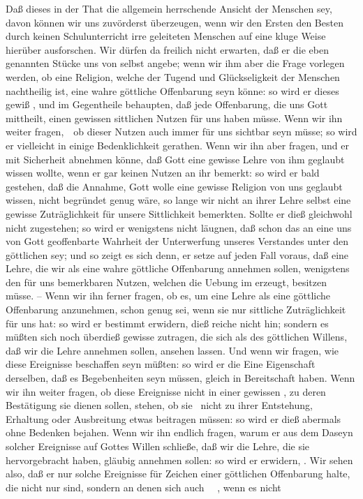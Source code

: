 \begin{aufza}\setcounter{enumi}{2}
\item Daß dieses in der That die allgemein herrschende Ansicht der Menschen sey, davon können wir uns zuvörderst überzeugen, wenn wir den Ersten den Besten durch keinen Schulunterricht irre geleiteten Menschen auf eine kluge Weise hierüber ausforschen. Wir dürfen da freilich nicht erwarten, daß er die eben genannten Stücke uns von selbst angebe; wenn wir ihm aber die Frage vorlegen werden, ob eine Religion, welche der Tugend und Glückseligkeit der Menschen nachtheilig ist, eine wahre göttliche Offenbarung seyn könne: so wird er dieses gewiß , und im Gegentheile behaupten, daß jede Offenbarung, die uns Gott mittheilt, einen gewissen sittlichen Nutzen für uns haben müsse. Wenn wir ihn weiter fragen,~\ ob dieser Nutzen auch immer für uns sichtbar seyn müsse; so wird er vielleicht in einige Bedenklichkeit gerathen. Wenn wir ihn aber fragen,  und  er mit Sicherheit abnehmen könne, daß Gott eine gewisse Lehre von ihm geglaubt wissen wollte, wenn er gar keinen Nutzen an ihr bemerkt: so wird er bald gestehen, daß die Annahme, Gott wolle eine gewisse Religion von uns geglaubt wissen, nicht begründet genug wäre, so lange wir nicht an ihrer Lehre selbst eine gewisse Zuträglichkeit für unsere Sittlichkeit bemerkten. Sollte er dieß gleichwohl nicht zugestehen; so wird er wenigstens nicht läugnen, daß schon das  an eine uns von Gott geoffenbarte Wahrheit  der Unterwerfung unseres Verstandes unter den göttlichen sey; und so zeigt es sich denn, er setze auf jeden Fall voraus, daß eine Lehre, die wir als eine wahre göttliche Offenbarung annehmen sollen, wenigstens den für uns bemerkbaren Nutzen, welchen die Uebung im  erzeugt, besitzen müsse. -- Wenn wir ihn ferner fragen, ob es, um eine Lehre als eine göttliche Offenbarung anzunehmen, schon genug sei, wenn sie nur sittliche Zuträglichkeit für uns hat: so wird er bestimmt erwidern, dieß reiche nicht hin; sondern es müßten sich noch überdieß gewisse  zutragen, die sich als  des göttlichen Willens, daß wir die Lehre annehmen sollen, ansehen lassen. Und wenn wir fragen, wie diese Ereignisse beschaffen seyn müßten: so wird er die Eine Eigenschaft derselben, daß es  Begebenheiten seyn müssen, gleich in Bereitschaft haben. Wenn wir ihn weiter fragen, ob diese Ereignisse nicht in einer gewissen , zu deren Bestätigung sie dienen sollen, stehen, ob sie \zB\ nicht zu ihrer Entstehung, Erhaltung oder Ausbreitung etwas beitragen müssen: so wird er dieß abermals ohne Bedenken bejahen. Wenn wir ihn endlich fragen, warum er aus dem Daseyn solcher Ereignisse auf Gottes Willen schließe, daß wir die Lehre, die sie hervorgebracht haben, gläubig annehmen sollen: so wird er erwidern, . Wir sehen also, daß er nur solche Ereignisse für Zeichen einer göttlichen Offenbarung halte, die nicht nur  sind, sondern an denen sich auch ~\ , wenn es nicht 
\end{aufza}
